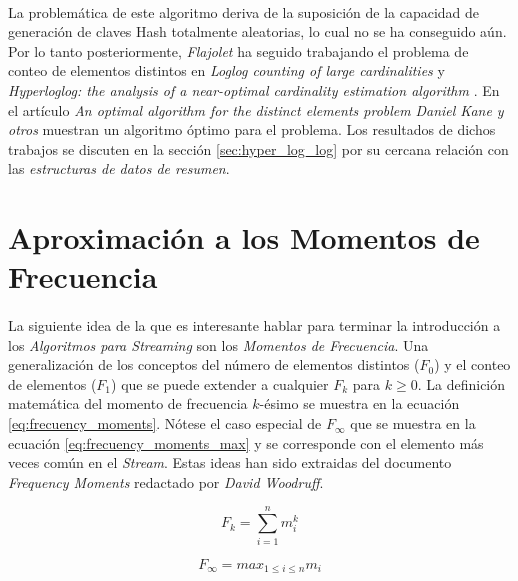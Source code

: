 \documentclass{subfiles}
\begin{document}
      \paragraph{}
      La problemática de este algoritmo deriva de la suposición de la capacidad de generación de claves Hash totalmente aleatorias, lo cual no se ha conseguido aún. Por lo tanto posteriormente, \emph{Flajolet} ha seguido trabajando el problema de conteo de elementos distintos en \emph{Loglog counting of large cardinalities} \cite{durand2003loglog} y \emph{Hyperloglog: the analysis of a near-optimal cardinality estimation algorithm} \cite{flajolet2007hyperloglog}. En el artículo \emph{An optimal algorithm for the distinct elements problem} \cite{kane2010optimal} \emph{Daniel Kane y otros} muestran un algoritmo óptimo para el problema. Los resultados de dichos trabajos se discuten en la sección \ref{sec:hyper_log_log} por su cercana relación con las \emph{estructuras de datos de resumen}.


    \section{Aproximación a los Momentos de Frecuencia}
    \label{sec:streaming_frecuency_moment_aproximation}

      \paragraph{}
      La siguiente idea de la que es interesante hablar para terminar la introducción a los \emph{Algoritmos para Streaming} son los \emph{Momentos de Frecuencia}. Una generalización de los conceptos del número de elementos distintos ($F_0$) y el conteo de elementos ($F_1$) que se puede extender a cualquier $F_k$ para $k \geq 0 $. La definición matemática del momento de frecuencia $k$-ésimo se muestra en la ecuación \eqref{eq:frecuency_moments}. Nótese el caso especial de $F_\infty$ que se muestra en la ecuación \eqref{eq:frecuency_moments_max} y se corresponde con el elemento más veces común en el \emph{Stream}. Estas ideas han sido extraidas del documento \emph{Frequency Moments} \cite{woodruff2009frequency} redactado por \emph{David Woodruff}.

      \begin{equation}
      \label{eq:frecuency_moments}
        F_k = \sum_{i=1}^n m_i^k
      \end{equation}

      \begin{equation}
      \label{eq:frecuency_moments_max}
        F_\infty = max_{1 \leq i \leq n} m_i
      \end{equation}
\end{document}

